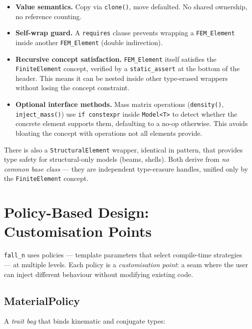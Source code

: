 \begin{itemize}[nosep]
  \item \textbf{Value semantics.} Copy via \texttt{clone()}, move defaulted.
        No shared ownership, no reference counting.
  \item \textbf{Self-wrap guard.} A \texttt{requires} clause prevents wrapping
        a \texttt{FEM\_Element} inside another \texttt{FEM\_Element} (double
        indirection).
  \item \textbf{Recursive concept satisfaction.} \texttt{FEM\_Element} itself
        satisfies the \texttt{FiniteElement} concept, verified by a
        \texttt{static\_assert} at the bottom of the header.  This means it
        can be nested inside other type-erased wrappers without losing the
        concept constraint.
  \item \textbf{Optional interface methods.} Mass matrix operations
        (\texttt{density()}, \texttt{inject\_mass()}) use \texttt{if constexpr}
        inside \texttt{Model<T>} to detect whether the concrete element
        supports them, defaulting to a no-op otherwise.  This avoids bloating
        the concept with operations not all elements provide.
\end{itemize}

There is also a \texttt{StructuralElement} wrapper, identical in pattern,
that provides type safety for structural-only models (beams, shells).  Both
derive from \emph{no common base class} --- they are independent type-erasure
handles, unified only by the \texttt{FiniteElement} concept.


\section{Policy-Based Design: Customisation Points}
\label{sec:policies}

\texttt{fall\_n} uses policies --- template parameters that select
compile-time strategies --- at multiple levels.  Each policy is a
\emph{customisation point}: a seam where the user can inject different
behaviour without modifying existing code.

\subsection{MaterialPolicy}
\label{sec:mat_policy}

A \emph{trait bag} that binds kinematic and conjugate types:

